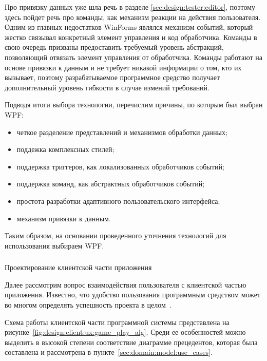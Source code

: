 Про привязку данных уже шла речь в разделе \ref{sec:design:tester:editor}, поэтому здесь пойдет речь про команды, как механизм реакции на действия пользователя.
Одним из главных недостатков WinForms являлся механизм событий, который жестко связывал конкретный элемент управления и код обработчика. Команды в свою очередь призваны 
предоставить требуемый уровень абстракций, позволяющий отвязать элемент управления от обработчика. Команды работают на основе привязки к данным и не требует никакой информации
о том, кто их вызывает, поэтому разрабатываемое программное средство получает дополнительный уровень гибкости в случае измений требований.

Подводя итоги выбора технологии, перечислим причины, по которым был выбран WPF:

\begin{itemize}
	\item четкое разделение представлений и механизмов обработки данных;
	\item поддежка комплексных стилей;
	\item поддержка триггеров, как локализованных обработчиков событий;
	\item поддержка команд, как абстрактных обработчиков событий;
	\item простота разработки адаптивного пользовательского интерфейса;
	\item механизм привязки к данным.
\end{itemize}

Таким образом, на основании проведенного уточнения технологий для использования выбираем WPF.

\subsubsection{} Проектирование клиентской части приложения
\label{sec:design:client:ux}

Далее рассмотрим вопрос взаимодействия пользователя с клиентской частью приложения. Известно, что удобство пользования программным 
средством может во многом определять успешность проекта в целом~\cite[с.~44]{book_makkonel}.

Схема работы клиентской части программной системы представлена на рисунке~\ref{fig:design:client:ux:game_play_alg}. Среди ее особенностей можно выделить в высокой степени соответствие диаграмме прецедентов, которая была составлена и рассмотрена в пункте~\ref{sec:domain:model:use_cases}.

